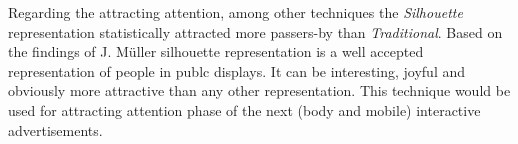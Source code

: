 Regarding the attracting attention, among other techniques the \emph{Silhouette} representation statistically attracted more passers-by than \emph{Traditional}. Based on the findings of J. Müller\cite{LookingGlass} silhouette representation is a well accepted representation of people in publc displays. It can be interesting, joyful and obviously more attractive than any other representation. This technique would be used for attracting attention phase of the next (body and mobile) interactive advertisements.






